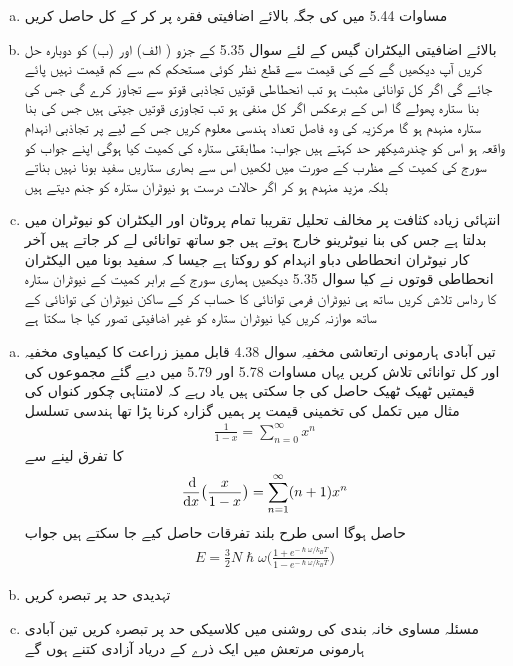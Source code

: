 \begin{enumerate}[a.]
\item
مساوات 5.44 میں  کی جگہ بالائے اضافیتی فقرہ  پر کر کے  كل حاصل کریں 
\item
بالائے اضافیتی الیکٹران گیس کے لئے سوال 5.35 کے جزو ( الف) اور (ب) کو دوبارہ حل کریں آپ دیکھیں گے کے  کی قیمت سے قطع نظر کوئی مستحکم کم سے كم قیمت نہیں پائے جائے گی اگر کل توانائی مثبت ہو تب انحطاطی قوتیں تجاذبی قوتو سے تجاوز کرے گی جس کی بنا ستارہ پھولے گا اس کے برعکس اگر کل منفی ہو تب تجاوزی قوتيں جیتی ہیں جس کی بنا ستارہ منہدم ہو گا مرکزیہ کی وہ فاصل تعداد ہندسی معلوم کریں جس کے لیے  پر تجاذبی انہدام واقعہ ہو اس کو چندرشیكهر حد کہتے ہیں جواب:  مطابقتی ستارہ کی کمیت کیا ہوگی اپنے جواب کو سورج کی کمیت کے مظرب کے صورت میں لکھیں اس سے بھاری ستاریں سفید بونا نہیں بناتے بلکہ مزید منہدم ہو کر اگر حالات درست ہو نیوٹران ستارہ کو جنم دیتے ہیں 
\item
انتہائی زیادہ کثافت پر مخالف  تحلیل  تقریبا تمام پروٹان اور الیکٹران کو نیوٹران میں بدلتا ہے جس کی بنا نیوٹرینو خارج ہوتے ہیں جو ساتھ توانائی لے کر جاتے ہیں آخر کار نیوٹران انحطاطی دباو انہدام کو روکتا ہے جیسا کہ سفید بونا میں الیکٹران انحطاطی قوتوں نے کیا سوال 5.35 دیکھیں ہماری سورج کے برابر کمیت کے نیوٹران ستارہ کا رداس تلاش کریں ساتھ ہی نیوٹران فرمی توانائی کا حساب کر کے ساکن نیوٹران کی توانائی کے ساتھ موازنہ کریں کیا نیوٹران ستارہ کو غیر اضافیتی تصور کیا جا سکتا ہے 
\end{enumerate}
\begin{enumerate}[a.]
\item
تیں آبادی ہارمونی ارتعاشی مخفیہ سوال
4.38 قابل ممیز زراعت کا کیمیاوی مخفیہ اور کل توانائی تلاش کریں یہاں مساوات 5.78 اور 5.79 میں دیے گئے مجموعوں کی قیمتیں ٹھیک ٹھیک حاصل کی جا سکتی ہیں یاد رہے کہ لامتناہی چکور کنواں کی مثال میں تکمل کی تخمینی قیمت پر ہمیں گزارہ کرنا پڑا تھا ہندسی تسلسل 
\begin{align}
\frac{1}{1 - x} = \sum_{n = 0}^{\infty} x^{n}
\end{align}
کا تفرق لینے سے 
\begin{align*}
\frac{\dif}{\dif x} \big ( \frac{x}{1 - x} \big ) = \sum_{n = 1}^{\infty} (n + 1) x^{n}
\end{align*}
حاصل ہوگا اسی طرح بلند تفرقات حاصل کیے جا سکتے ہیں جواب 
\begin{align}
E = \frac{3}{2} N \hslash \omega \big ( \frac{1 + e^{- \hslash \omega / k_B T}}{1 - e^{- \hslash \omega / k_B T}} \big )
\end{align}
\item
تہدیدی حد  پر تبصرہ کریں 
\item
مسئلہ مساوی خانہ بندی کی روشنی میں کلاسیکی حد  پر تبصرہ کریں تین آبادی ہارمونی مرتعش میں ایک ذرے کے دریاد آزادی کتنے ہوں گے 
\end{enumerate}

